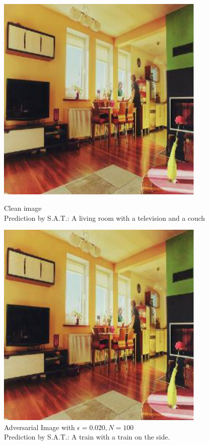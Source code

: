 \begin{figure}[ht]
    \centering
    \begin{minipage}{0.45\textwidth}
        \centering
        \includegraphics[width=0.9\textwidth]{figures/Distract/n=100/samples/0.000/img_0.jpg} %
        \caption*{Clean image\\Prediction by S.A.T.: A living room with a television and a couch}
    \end{minipage}\hfill
    \begin{minipage}{0.45\textwidth}
        \centering
        \includegraphics[width=0.9\textwidth]{figures/Distract/n=100/samples/0.020/img_0.jpg} %
        \caption*{Adversarial Image with $\epsilon=0.020, N=100$\\Prediction by S.A.T.: A train with a train on the side.}
    \end{minipage}
\end{figure}

